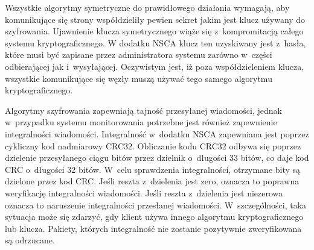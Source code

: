 Wszystkie algorytmy symetryczne do prawidłowego działania wymagają,
aby komunikujące się strony współdzieliły pewien sekret jakim jest
klucz używany do szyfrowania. Ujawnienie klucza symetrycznego wiąże
się z~kompromitacją całego systemu kryptograficznego. W dodatku NSCA
klucz ten uzyskiwany jest z~hasła, które musi być zapisane przez
administratora systemu zarówno w~części odbierającej jak
i~wysyłającej. Oczywistym jest, iż poza współdzieleniem klucza,
wszystkie komunikujące się węzły muszą używać tego samego algorytmu
kryptograficznego.

Algorytmy szyfrowania zapewniają tajność przesyłanej wiadomości,
jednak w~przypadku systemu monitorowania potrzebne jest również
zapewnienie integralności wiadomości. Integralność w~dodatku NSCA
zapewniana jest poprzez cykliczny kod nadmiarowy CRC32. Obliczanie
kodu CRC32 odbywa się poprzez dzielenie przesyłanego ciągu bitów przez
dzielnik o~długości 33 bitów, co daje kod CRC o~długości 32
bitów. W~celu sprawdzenia integralności, otrzymane bity są dzielone
przez kod CRC. Jeśli reszta z~dzielenia jest zero, oznacza to poprawna
weryfikację integralności wiadomości. Jeśli reszta z~dzielenia jest
niezerowa oznacza to naruszenie integralności przesłanej
wiadomości. W~szczególności, taka sytuacja może się zdarzyć, gdy
klient używa innego algorytmu kryptograficznego lub klucza. Pakiety,
których integralność nie zostanie pozytywnie zweryfikowana są
odrzucane.

